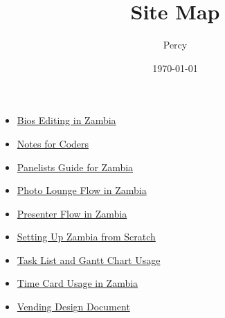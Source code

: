 \documentclass{article}
\author{Percy}
\date{\today}
\title{Site Map}
\begin{document}
\maketitle
\tableofcontents

\begin{itemize}
\item \href{Bio_Editing.org}{Bios Editing in Zambia} \\
\item \href{NotesForCoders.org}{Notes for Coders} \\
\item \href{Panelists_Guide.org}{Panelists Guide for Zambia} \\
\item \href{Photo_Lounge.org}{Photo Lounge Flow in Zambia} \\
\item \href{Presenter_Flow.org}{Presenter Flow in Zambia} \\
\item \href{Setting_Up.org}{Setting Up Zambia from Scratch} \\
\item \href{Tasks-Gantt_Chart.org}{Task List and Gantt Chart Usage} \\
\item \href{Time_Card.org}{Time Card Usage in Zambia} \\
\item \href{Vending_Design_Document.org}{Vending Design Document} \\
\end{itemize}
\end{document}
